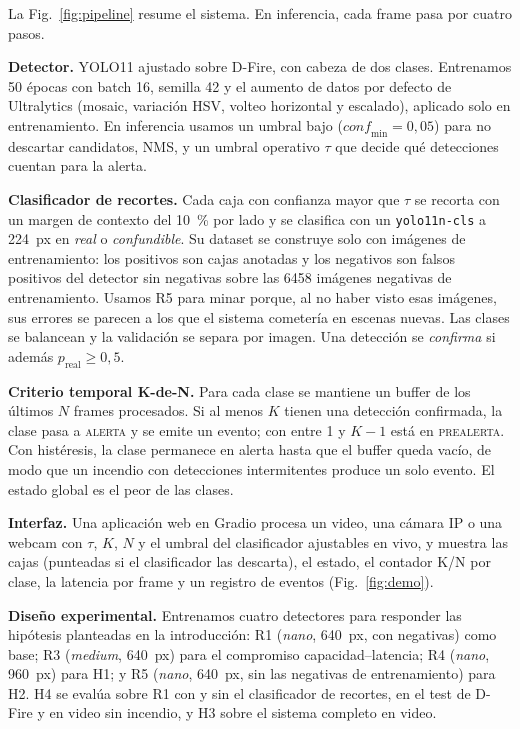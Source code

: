 \documentclass[conference,a4paper]{IEEEtran}
\begin{document}
La Fig.~\ref{fig:pipeline} resume el sistema. En inferencia, cada frame pasa por cuatro pasos.

\textbf{Detector.} YOLO11 ajustado sobre D-Fire, con cabeza de dos clases. Entrenamos 50 épocas con batch 16, semilla 42 y el aumento de datos por defecto de Ultralytics (mosaic, variación HSV, volteo horizontal y escalado), aplicado solo en entrenamiento. En inferencia usamos un umbral bajo ($\mathit{conf}_{\min}=0{,}05$) para no descartar candidatos, NMS, y un umbral operativo $\tau$ que decide qué detecciones cuentan para la alerta.

\textbf{Clasificador de recortes.} Cada caja con confianza mayor que $\tau$ se recorta con un margen de contexto del \SI{10}{\percent} por lado y se clasifica con un \texttt{yolo11n-cls} a \SI{224}{px} en \textit{real} o \textit{confundible}. Su dataset se construye solo con imágenes de entrenamiento: los positivos son cajas anotadas y los negativos son falsos positivos del detector sin negativas sobre las \num{6458} imágenes negativas de entrenamiento. Usamos R5 para minar porque, al no haber visto esas imágenes, sus errores se parecen a los que el sistema cometería en escenas nuevas. Las clases se balancean y la validación se separa por imagen. Una detección se \emph{confirma} si además $p_{\mathrm{real}} \ge 0{,}5$.

\textbf{Criterio temporal K-de-N.} Para cada clase se mantiene un buffer de los últimos $N$ frames procesados. Si al menos $K$ tienen una detección confirmada, la clase pasa a \textsc{alerta} y se emite un evento; con entre 1 y $K-1$ está en \textsc{prealerta}. Con histéresis, la clase permanece en alerta hasta que el buffer queda vacío, de modo que un incendio con detecciones intermitentes produce un solo evento. El estado global es el peor de las clases.

\textbf{Interfaz.} Una aplicación web en Gradio procesa un video, una cámara IP o una webcam con $\tau$, $K$, $N$ y el umbral del clasificador ajustables en vivo, y muestra las cajas (punteadas si el clasificador las descarta), el estado, el contador K/N por clase, la latencia por frame y un registro de eventos (Fig.~\ref{fig:demo}).

\textbf{Diseño experimental.} Entrenamos cuatro detectores para responder las hipótesis planteadas en la introducción: R1 (\textit{nano}, \SI{640}{px}, con negativas) como base; R3 (\textit{medium}, \SI{640}{px}) para el compromiso capacidad--latencia; R4 (\textit{nano}, \SI{960}{px}) para H1; y R5 (\textit{nano}, \SI{640}{px}, sin las negativas de entrenamiento) para H2. H4 se evalúa sobre R1 con y sin el clasificador de recortes, en el test de D-Fire y en video sin incendio, y H3 sobre el sistema completo en video.
\end{document}
